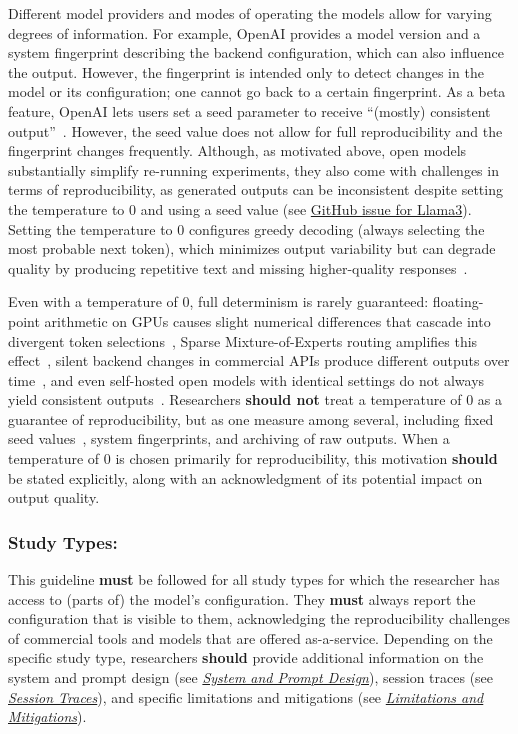 \documentclass[smallextended]{svjour3}
\newcommand{\must}{\textbf{must}\xspace}
\newcommand{\should}{\textbf{should}\xspace}
\newcommand{\shouldnot}{\textbf{should not}\xspace}
\newcommand{\design}{\hyperref[sec:report-system-and-prompt-design]{\emph{System and Prompt Design}}\xspace}
\newcommand{\traces}{\hyperref[sec:report-session-traces]{\emph{Session Traces}}\xspace}
\newcommand{\limitationsmitigations}{\hyperref[sec:report-limitations-and-mitigations]{\emph{Limitations and Mitigations}}\xspace}
\newcommand{\design}{\href{/guidelines\#report-system-and-prompt-design}{\emph{System and Prompt Design}}\xspace}
\newcommand{\traces}{\href{/guidelines\#report-session-traces}{\emph{Session Traces}}\xspace}
\newcommand{\limitationsmitigations}{\href{/guidelines\#report-limitations-and-mitigations}{\emph{Limitations and Mitigations}}\xspace}
\newcommand{\guidelinesubsubsection}[1]{\subsubsection{\bfseries #1:}}
\newcommand{\guidelinesubsubsection}[1]{\subsubsection{#1}}
\begin{document}
Different model providers and modes of operating the models allow for varying degrees of information.
For example, OpenAI provides a model version and a system fingerprint describing the backend configuration, which can also influence the output.
However, the fingerprint is intended only to detect changes in the model or its configuration; one cannot go back to a certain fingerprint.
As a beta feature, OpenAI lets users set a seed parameter to receive ``(mostly) consistent output''~\cite{OpenAI23}.
However, the seed value does not allow for full reproducibility and the fingerprint changes frequently. 
Although, as motivated above, open models substantially simplify re-running experiments, they also come with challenges in terms of reproducibility, as generated outputs can be inconsistent despite setting the temperature to 0 and using a seed value (see \href{https://github.com/ollama/ollama/issues/5321}{GitHub issue for Llama3}).
Setting the temperature to 0 configures greedy decoding (always selecting the most probable next token), which minimizes output variability but can degrade quality by producing repetitive text and missing higher-quality responses~\cite{DBLP:conf/iclr/HoltzmanBDFC20}.

Even with a temperature of 0, full determinism is rarely guaranteed: floating-point arithmetic on GPUs causes slight numerical differences that cascade into divergent token selections~\cite{YuanNondeterminismLLMInference}, Sparse Mixture-of-Experts routing amplifies this effect~\cite{Chann2023}, silent backend changes in commercial APIs produce different outputs over time~\cite{DBLP:journals/corr/abs-2307-09009}, and even self-hosted open models with identical settings do not always yield consistent outputs~\cite{DBLP:journals/corr/abs-2510-25506, DBLP:conf/naacl/SongWLL25}.
Researchers \shouldnot treat a temperature of 0 as a guarantee of reproducibility, but as one measure among several, including fixed seed values~\cite{OpenAI23}, system fingerprints, and archiving of raw outputs.
When a temperature of 0 is chosen primarily for reproducibility, this motivation \should be stated explicitly, along with an acknowledgment of its potential impact on output quality.

\guidelinesubsubsection{Study Types}

This guideline \must be followed for all study types for which the researcher has access to (parts of) the model's configuration.
They \must always report the configuration that is visible to them, acknowledging the reproducibility challenges of commercial tools and models that are offered as-a-service.
Depending on the specific study type, researchers \should provide additional information on the system and prompt design (see \design), session traces (see \traces), and specific limitations and mitigations (see \limitationsmitigations).
\end{document}
